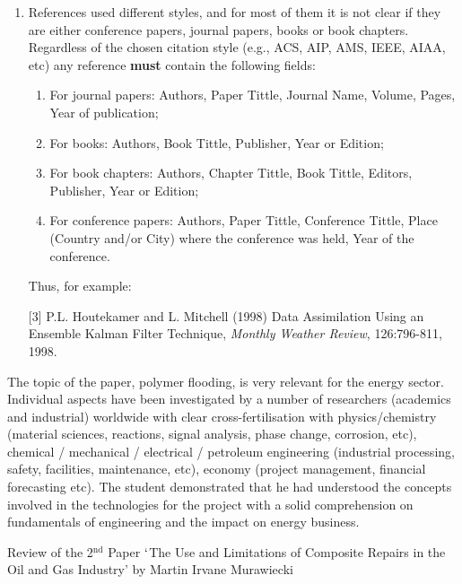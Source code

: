 \documentclass[14pt,twoside]{report}
\begin{document}
\begin{enumerate}
%
\item References used different styles, and for most of them it is not clear if they are either conference papers, journal papers, books or book chapters. Regardless of the chosen citation style (e.g., ACS, AIP, AMS, IEEE, AIAA, etc) any reference {\bf must} contain the following fields: 
\begin{enumerate}
\item For journal papers: Authors, Paper Tittle, Journal Name, Volume, Pages, Year of publication;
\item For books: Authors, Book Tittle, Publisher, Year or Edition;
\item For book chapters: Authors, Chapter Tittle, Book Tittle, Editors, Publisher, Year or Edition;
\item For conference papers: Authors, Paper Tittle, Conference Tittle, Place (Country and/or City) where the conference was held, Year of the conference.
\end{enumerate}  
Thus, for example:

[3] P.L. Houtekamer and L. Mitchell (1998) Data Assimilation Using an Ensemble Kalman Filter Technique, {\it Monthly Weather Review}, 126:796-811, 1998.
%
\end{enumerate}

The topic of the paper, polymer flooding, is very relevant for the energy sector. Individual aspects have been investigated by a number of researchers (academics and industrial) worldwide with clear cross-fertilisation with physics/chemistry (material sciences, reactions, signal analysis, phase change, corrosion, etc), chemical / mechanical / electrical / petroleum engineering (industrial processing, safety, facilities, maintenance, etc), economy (project management, financial forecasting etc). The student demonstrated that he had understood the concepts involved in the technologies for the project with a solid comprehension on fundamentals of engineering and the impact on energy business.    


\clearpage





\bigskip

\begin{center}
{\Large Review of the 2$^{\text{nd}}$ Paper $\lq$The Use and Limitations of Composite Repairs in the Oil and Gas Industry' by Martin Irvane Murawiecki}
\end{center}
\end{document}
